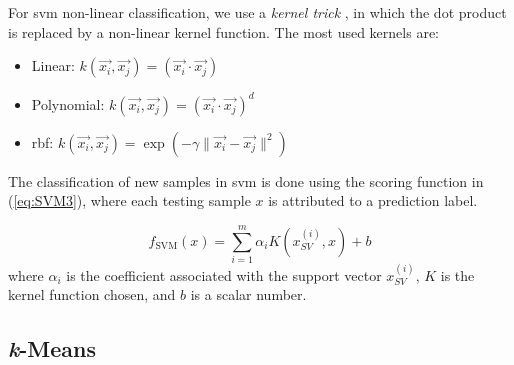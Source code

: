 For \ac{svm} non-linear classification, we use a \textit{kernel trick} \cite{scholkopf2001kernel}, in which the dot product is replaced by a non-linear kernel function. The most used kernels are:

\begin{itemize}
    
    \item Linear: ${\displaystyle k({\vec {x_{i}}},{\vec {x_{j}}})=({\vec {x_{i}}}\cdot {\vec {x_{j}}})}$

    \item Polynomial: ${\displaystyle k({\vec {x_{i}}},{\vec {x_{j}}})=({\vec {x_{i}}}\cdot {\vec {x_{j}}})^{d}}$

    \item \ac{rbf}: ${\displaystyle k({\vec {x_{i}}},{\vec {x_{j}}})=\exp(-\gamma \|{\vec {x_{i}}}-{\vec {x_{j}}}\|^{2})}$
\end{itemize}


The classification of new samples in \ac{svm} is done using the scoring function in (\ref{eq:SVM3}), where each testing sample $x$ is attributed to a prediction label.

\begin{equation}
\label{eq:SVM3}
f_{\text{SVM}}(x)=\sum_{i=1}^m \alpha_i K (x_{SV}^{(i)},x)+b
\end{equation}
where $\alpha_i$ is the coefficient associated with the support vector $x_{SV}^{(i)}$, $K$ is the kernel function chosen, and $b$ is a scalar number.




\subsection{\textit{k}-Means}
\label{ssec:kMeans}

